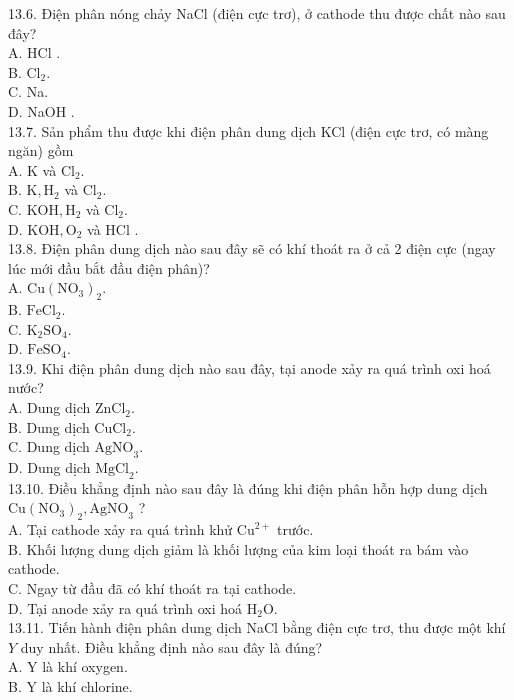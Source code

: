 \documentclass[10pt]{article}
\begin{document}
13.6. Điện phân nóng chảy NaCl (điện cực trơ), ở cathode thu được chất nào sau đây?\\
A. HCl .\\
B. $\mathrm{Cl}_{2}$.\\
C. Na.\\
D. NaOH .\\
13.7. Sản phẩm thu được khi điện phân dung dịch KCl (điện cực trơ, có màng ngăn) gồm\\
A. K và $\mathrm{Cl}_{2}$.\\
B. $\mathrm{K}, \mathrm{H}_{2}$ và $\mathrm{Cl}_{2}$.\\
C. $\mathrm{KOH}, \mathrm{H}_{2}$ và $\mathrm{Cl}_{2}$.\\
D. $\mathrm{KOH}, \mathrm{O}_{2}$ và HCl .\\
13.8. Điện phân dung dịch nào sau đây sẽ có khí thoát ra ở cả 2 điện cực (ngay lúc mới đầu bắt đầu điện phân)?\\
A. $\mathrm{Cu}\left(\mathrm{NO}_{3}\right)_{2}$.\\
B. $\mathrm{FeCl}_{2}$.\\
C. $\mathrm{K}_{2} \mathrm{SO}_{4}$.\\
D. $\mathrm{FeSO}_{4}$.\\
13.9. Khi điện phân dung dịch nào sau đây, tại anode xảy ra quá trình oxi hoá nước?\\
A. Dung dịch $\mathrm{ZnCl}_{2}$.\\
B. Dung dịch $\mathrm{CuCl}_{2}$.\\
C. Dung dịch $\mathrm{AgNO}_{3}$.\\
D. Dung dịch $\mathrm{MgCl}_{2}$.\\
13.10. Điều khẳng định nào sau đây là đúng khi điện phân hỗn hợp dung dịch $\mathrm{Cu}\left(\mathrm{NO}_{3}\right)_{2}, \mathrm{AgNO}_{3}$ ?\\
A. Tại cathode xảy ra quá trình khử $\mathrm{Cu}^{2+}$ trước.\\
B. Khối lượng dung dịch giảm là khối lượng của kim loại thoát ra bám vào cathode.\\
C. Ngay từ đầu đã có khí thoát ra tại cathode.\\
D. Tại anode xảy ra quá trình oxi hoá $\mathrm{H}_{2} \mathrm{O}$.\\
13.11. Tiến hành điện phân dung dịch NaCl bằng điện cực trơ, thu được một khí $Y$ duy nhất. Điều khẳng định nào sau đây là đúng?\\
A. Y là khí oxygen.\\
B. Y là khí chlorine.\\
\end{document}
